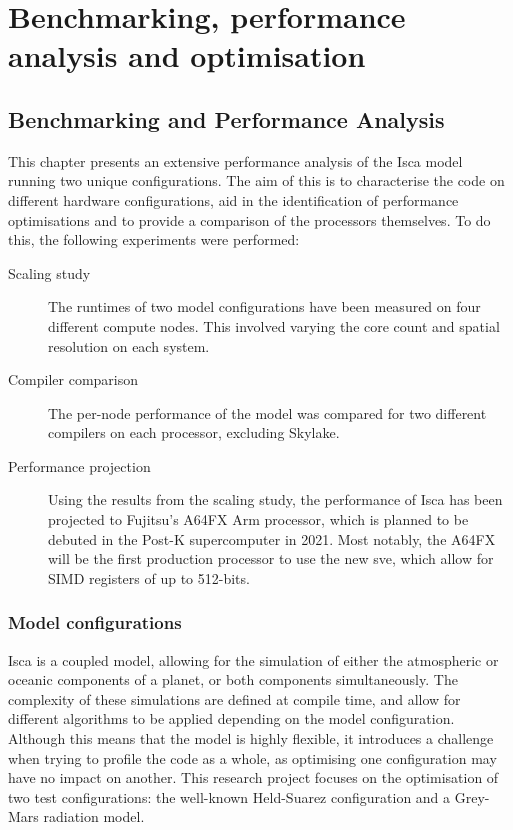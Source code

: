 \documentclass[a4paper,11pt]{report}
\begin{document}
\part{Benchmarking, performance analysis and optimisation}
\chapter{Benchmarking and Performance Analysis}
This chapter presents an extensive performance analysis of the Isca model running two unique configurations. The aim of this is to characterise the code on different hardware configurations, aid in the identification of performance optimisations and to provide a comparison of the processors themselves. To do this, the following experiments were performed:

\begin{description}

	\item[Scaling study] The runtimes of two model configurations have been measured on four different compute nodes. This involved varying the core count and spatial resolution on each system.
	
	\item[Compiler comparison] The per-node performance of the model was compared for two different compilers on each processor, excluding Skylake.
	
	\item[Performance projection] Using the results from the scaling study, the performance of Isca has been projected to Fujitsu's A64FX Arm processor, which is planned to be debuted in the Post-K supercomputer in 2021. Most notably, the A64FX will be the first production processor to use the new \gls{sve}, which allow for SIMD registers of up to 512-bits.
	
\end{description}

\section{Model configurations}
Isca is a coupled model, allowing for the simulation of either the atmospheric or oceanic components of a planet, or both components simultaneously. The complexity of these simulations are defined at compile time, and allow for different algorithms to be applied depending on the model configuration. Although this means that the model is highly flexible, it introduces a challenge when trying to profile the code as a whole, as optimising one configuration may have no impact on another. This research project focuses on the optimisation of two test configurations: the well-known Held-Suarez configuration and a Grey-Mars radiation model.
\end{document}
